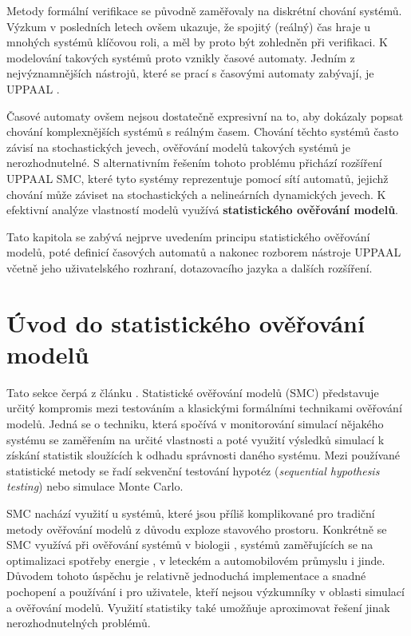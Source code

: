Metody formální verifikace se původně zaměřovaly na diskrétní chování systémů. Výzkum v posledních letech ovšem ukazuje, že spojitý (reálný) čas hraje u mnohých systémů klíčovou roli, a měl by proto být zohledněn při verifikaci. K modelování takových systémů proto vznikly časové automaty. Jedním z nejvýznamnějších nástrojů, které se prací s časovými automaty zabývají, je UPPAAL \cite{uppaal_smc}.

Časové automaty ovšem nejsou dostatečně expresivní na to, aby dokázaly popsat chování komplexnějších systémů s reálným časem. Chování těchto systémů často závisí na stochastických jevech, ověřování modelů takových systémů je nerozhodnutelné. S alternativním řešením tohoto problému přichází rozšíření UPPAAL SMC, které tyto systémy reprezentuje pomocí sítí automatů, jejichž chování může záviset na stochastických a nelineárních dynamických jevech. K efektivní analýze vlastností modelů využívá \textbf{statistického ověřování modelů}.

Tato kapitola se zabývá nejprve uvedením principu statistického ověřování modelů, poté definicí časových automatů a nakonec rozborem nástroje UPPAAL včetně jeho uživatelského rozhraní, dotazovacího jazyka a dalších rozšíření.

\section{Úvod do statistického ověřování modelů}
Tato sekce čerpá z článku \cite{uppaal_smc}. Statistické ověřování modelů (SMC) představuje určitý kompromis mezi testováním a klasickými formálními technikami ověřování modelů. Jedná se o techniku, která spočívá v monitorování simulací nějakého systému se zaměřením na určité vlastnosti a poté využití výsledků simulací k získání statistik sloužících k odhadu správnosti daného systému. Mezi používané statistické metody se řadí sekvenční testování hypotéz (\textit{sequential hypothesis testing}) nebo simulace Monte Carlo.

SMC nachází využití u systémů, které jsou příliš komplikované pro tradiční metody ověřování modelů z důvodu exploze stavového prostoru. Konkrétně se SMC využívá při ověřování systémů v biologii \cite{smc_biology}, systémů zaměřujících se na optimalizaci spotřeby energie \cite{smc_energy_centric}, v leteckém a automobilovém průmyslu i jinde. Důvodem tohoto úspěchu je relativně jednoduchá implementace a snadné pochopení a používání i pro uživatele, kteří nejsou výzkumníky v oblasti simulací a ověřování modelů. Využití statistiky také umožňuje aproximovat řešení jinak nerozhodnutelných problémů.

